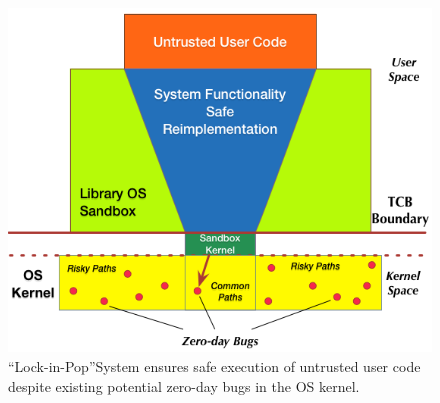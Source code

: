 {\begin{figure}%
\centering
\includegraphics[width=1.0\columnwidth]{diagram/Virtualization_Design_Model_01.png}
\caption{\small ``Lock-in-Pop''System ensures safe execution of untrusted user code
despite existing potential zero-day bugs in the OS kernel.}
\label{fig:design_safe_reimplementation}
\end{figure}


%




}
